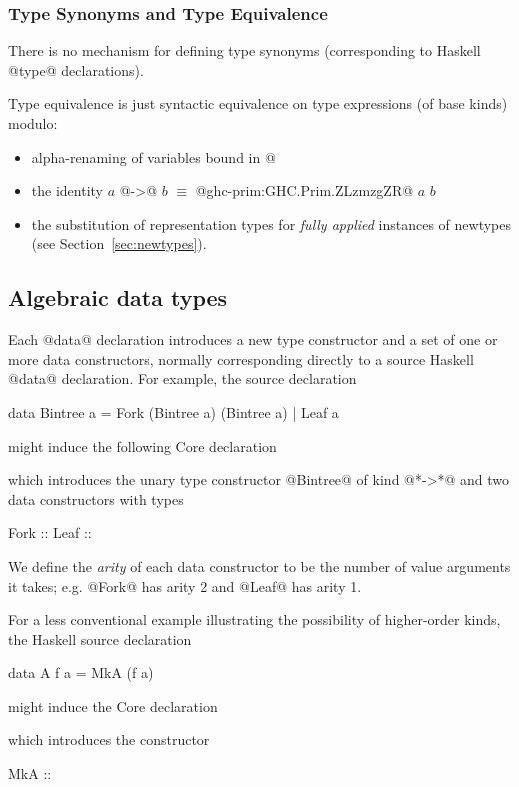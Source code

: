 \documentclass[10pt]{article}
\begin{document}
\subsubsection{Type Synonyms and Type Equivalence}
There is no mechanism for defining type synonyms (corresponding to
Haskell @type@ declarations).

Type equivalence is just syntactic equivalence on type expressions
(of base kinds) modulo:

\begin{itemize} 
\item alpha-renaming of variables bound in @%
\item the identity $a$ @->@ $b$ $\equiv$ @ghc-prim:GHC.Prim.ZLzmzgZR@ $a$ $b$
\item the substitution of representation types for {\it fully applied} instances of newtypes
(see Section~\ref{sec:newtypes}).
\end{itemize}

\subsection{Algebraic data types}

Each @data@ declaration introduces a new type constructor and a set of one or
more data constructors, normally corresponding directly to a source Haskell @data@ declaration.
For example, the source declaration
\begin{code}
data Bintree a =
   Fork (Bintree a) (Bintree a)
|  Leaf a
\end{code}
might induce the following Core declaration
which introduces the unary type constructor @Bintree@ of kind @*->*@  and two data constructors with types
\begin{code}
Fork :: %
Leaf :: %
\end{code}
We define the {\it arity} of each data constructor to be the number of value arguments it takes;
e.g. @Fork@ has arity 2 and @Leaf@ has arity 1.

For a less conventional example illustrating the possibility of higher-order kinds, the Haskell source declaration
\begin{code}
data A f a = MkA (f a)
\end{code}
might induce the Core declaration
\begin{code}
\end{code}
which introduces the constructor
\begin{code}
MkA :: %
\end{code}
\end{document}
